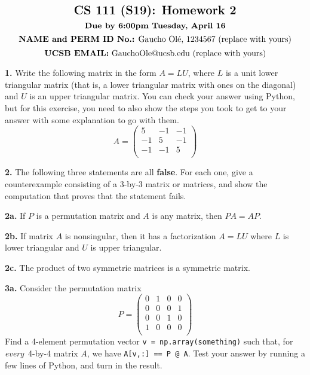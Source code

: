 \documentclass[11pt]{article}
\begin{document}
$$\mbox{\Large \textbf {CS 111 (S19): Homework 2}}$$
$$\mbox{\textbf {Due by 6:00pm Tuesday, April 16}}$$
$$\mbox{\textbf {NAME and PERM ID No.:} Gaucho Ol\'e, 1234567 (replace with yours)}$$
$$\mbox{\textbf {UCSB EMAIL:} GauchoOle@ucsb.edu (replace with yours)}$$

\par\bigskip
\textbf {1.}
Write the following matrix in the form $A=LU$, 
where $L$ is a unit lower triangular matrix
(that is, a lower triangular matrix with ones on the diagonal) 
and $U$ is an upper triangular matrix. You can check your answer using Python, but for this exercise, you need to also show the steps you took to get to your answer with some explanation to go with them.
$$A =
   \left(
   \begin{array}{ccc}
    5 & -1 & -1 \\  
   -1 &  5 & -1 \\ 
   -1 & -1 &  5 \\
   \end{array} \right)
$$

\par\bigskip
\textbf {2.}
The following three statements are all \textbf {false}. For each one, 
give a counterexample consisting of a 3-by-3 matrix or matrices, 
and show the computation that proves that the statement fails.

\par\medskip
\textbf {2a.}
If $P$ is a permutation matrix and $A$ is any matrix, then $PA=AP$.

\par\medskip
\textbf {2b.}
If matrix $A$ is nonsingular, then it has a factorization $A=LU$
where $L$ is lower triangular and $U$ is upper triangular.

\par\medskip
\textbf {2c.}
The product of two symmetric matrices is a symmetric matrix.

\par\bigskip
\textbf {3a.} Consider the permutation matrix 
$$P =
   \left(
   \begin{array}{cccc}
    0 & 1 & 0 & 0 \\  
    0 & 0 & 0 & 1 \\  
    0 & 0 & 1 & 0 \\  
    1 & 0 & 0 & 0 \\  
   \end{array} \right)
$$
Find a 4-element permutation vector {\tt v = np.array(something)}
such that, for {\em every}\, 4-by-4 matrix $A$, 
we have {\tt A[v,:] == P @ A}.
Test your answer by running a few lines of Python, 
and turn in the result. 
\end{document}
